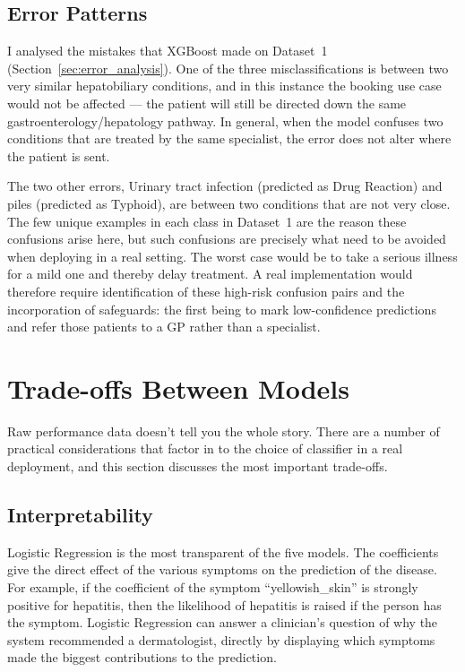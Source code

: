 \subsection{Error Patterns}

I analysed the mistakes that XGBoost made on Dataset~1 (Section~\ref{sec:error_analysis}). One of the three misclassifications is between two very similar hepatobiliary conditions, and in this instance the booking use case would not be affected --- the patient will still be directed down the same gastroenterology/hepatology pathway. In general, when the model confuses two conditions that are treated by the same specialist, the error does not alter where the patient is sent.

The two other errors, Urinary tract infection (predicted as Drug Reaction) and piles (predicted as Typhoid), are between two conditions that are not very close. The few unique examples in each class in Dataset~1 are the reason these confusions arise here, but such confusions are precisely what need to be avoided when deploying in a real setting. The worst case would be to take a serious illness for a mild one and thereby delay treatment. A real implementation would therefore require identification of these high-risk confusion pairs and the incorporation of safeguards: the first being to mark low-confidence predictions and refer those patients to a GP rather than a specialist.

\section{Trade-offs Between Models}
\label{sec:tradeoffs}

Raw performance data doesn't tell you the whole story. There are a number of practical considerations that factor in to the choice of classifier in a real deployment, and this section discusses the most important trade-offs.

\subsection{Interpretability}

Logistic Regression is the most transparent of the five models. The coefficients give the direct effect of the various symptoms on the prediction of the disease. For example, if the coefficient of the symptom ``yellowish\_skin'' is strongly positive for hepatitis, then the likelihood of hepatitis is raised if the person has the symptom. Logistic Regression can answer a clinician's question of why the system recommended a dermatologist, directly by displaying which symptoms made the biggest contributions to the prediction.

